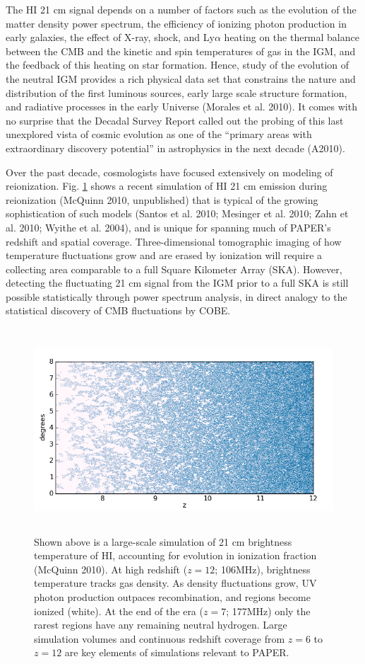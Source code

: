 \documentclass[preprint]{aastex}
\begin{document}
The HI 21 cm signal depends on a number of factors such as 
the evolution of the matter density power spectrum,
the efficiency of ionizing photon production in early galaxies,
the effect of X-ray, shock, and Ly$\alpha$ heating on 
the thermal balance between the CMB and the
kinetic and spin temperatures of gas in the IGM, and the
feedback of this heating on star formation.
Hence, study of the evolution
of the neutral IGM provides a rich physical data set that constrains
the nature and distribution of the first luminous sources, early large
scale structure formation, and radiative processes in the early
Universe (Morales et al. 2010). It comes with no surprise that the Decadal
Survey 
Report called out the probing of this last unexplored vista of cosmic
evolution as one of the ``primary areas with extraordinary discovery
potential'' in astrophysics in the next decade (A2010).

Over the past decade, cosmologists have focused extensively on modeling of reionization.
Fig. \ref{fig:eor_cut_mcquinn}
shows a recent simulation of HI 21 cm emission during reionization
(McQuinn 2010, unpublished) that is typical of the growing
sophistication of such models (Santos et al. 2010; Mesinger et
al.  2010; Zahn et al. 2010; Wyithe et al. 2004), and is unique for
spanning much of PAPER's redshift and spatial coverage.
Three-dimensional tomographic imaging of how temperature fluctuations
grow and are erased by ionization will require a collecting area
comparable to a full Square Kilometer Array (SKA). However, detecting
the fluctuating 21 cm signal from the IGM prior to a full SKA is still
possible statistically through power spectrum analysis, in direct
analogy to the statistical discovery of CMB fluctuations by COBE.

\begin{figure}[!ht]\centering
\includegraphics[height=3in]{plots/dens_ion_slice_v5.png}
\caption{Shown above is a large-scale simulation of 21 cm brightness
  temperature of HI, accounting for evolution in ionization fraction
  (McQuinn 2010).  At high redshift ($z=12$; 106MHz), brightness
  temperature tracks gas density.  As density fluctuations grow, UV
  photon production outpaces recombination, and regions become
  ionized (white). At the end of the era ($z=7$; 177MHz) only the
  rarest regions have any remaining neutral hydrogen.  Large simulation
  volumes and continuous redshift coverage from $z=6$ to $z=12$ are key elements of
  simulations relevant to PAPER.  }
\label{fig:eor_cut_mcquinn}
\end{figure}
\end{document}
